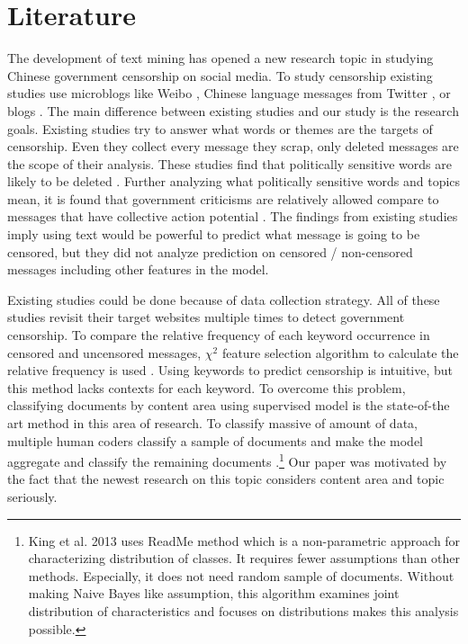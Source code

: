 \documentclass{sig-alternate-05-2015}
\begin{document}
\section{Literature}

The development of text mining has opened a new research topic in studying Chinese government censorship on social media. To study censorship existing studies use microblogs like Weibo \cite{bamman2012censorship, Fu2013a}, Chinese language messages from Twitter \cite{bamman2012censorship}, or blogs \cite{king2013censorship}. The main difference between existing studies and our study is the research goals. Existing studies try to answer what words \cite{bamman2012censorship, Fu2013a} or themes \cite{king2013censorship} are the targets of censorship. Even they collect every message they scrap, only deleted messages are the scope of their analysis. These studies find that politically sensitive words are likely to be deleted \cite{bamman2012censorship, Fu2013a}. Further analyzing what politically sensitive words and topics mean, it is found that government criticisms are relatively allowed compare to messages that have collective action potential \cite{king2013censorship}. The findings from existing studies imply using text would be powerful to predict what message is going to be censored, but they did not analyze prediction on censored / non-censored messages including other features in the model. 

Existing studies could be done because of data collection strategy. All of these studies revisit their target websites multiple times to detect government censorship. To compare the relative frequency of each keyword occurrence in censored and uncensored messages, $\chi^2$ feature selection algorithm to calculate the relative frequency is used \cite{Fu2013a}. Using keywords to predict censorship is intuitive, but this method lacks contexts for each keyword. To overcome this problem, classifying documents by content area using supervised model is the state-of-the art method in this area of research. To classify massive of amount of data, multiple human coders classify a sample of documents and make the model aggregate and classify the remaining documents \cite{king2013censorship}.\footnote{King et al. 2013 \cite{king2013censorship} uses ReadMe \cite{hopkins2010method} method which is a non-parametric approach for characterizing distribution of classes. It requires fewer assumptions than other methods. Especially, it does not need random sample of documents. Without making Naive Bayes like assumption, this algorithm examines joint distribution of characteristics  and focuses on distributions makes this analysis possible.} Our paper was motivated by the fact that the newest research on this topic considers content area and topic seriously.
\end{document}
